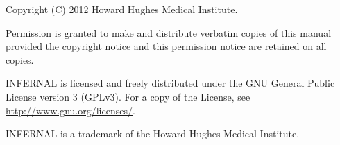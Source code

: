 \vspace*{\fill}
\begin{flushleft}
Copyright (C) 2012 Howard Hughes Medical Institute.\vspace{5mm}

\vspace{5mm}
Permission is granted to make and distribute verbatim copies of this
manual provided the copyright notice and this permission notice are
retained on all copies.\vspace{5mm}

\vspace{5mm} INFERNAL is licensed and freely distributed under the GNU
General Public License version 3 (GPLv3). For a copy of the License,
see \url{http://www.gnu.org/licenses/}.

\vspace{5mm}
INFERNAL is a trademark of the Howard Hughes Medical Institute.

\vspace{5mm}
\end{flushleft}



